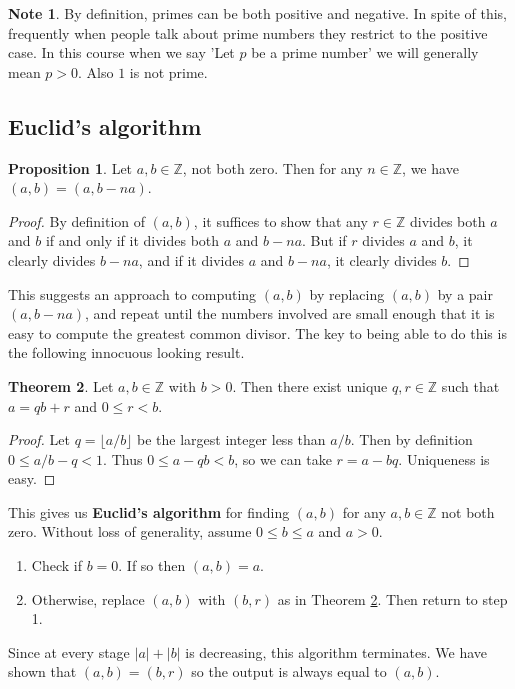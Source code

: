 \documentclass{article}
\newcommand{\Z}{\mathbb{Z}}
\newcommand{\rb}[1]{\left( #1 \right)}
\newcommand{\abs}[1]{\left\lvert #1 \right\rvert}
\theoremstyle{definition}\newtheorem{definition}{Definition}
\theoremstyle{definition}\newtheorem*{remark}{Remark}
\theoremstyle{definition}\newtheorem*{example}{Example}
\theoremstyle{definition}\newtheorem*{note}{Note}
\newtheorem{proposition}[definition]{Proposition}
\newtheorem{theorem}[definition]{Theorem}
\begin{document}
\begin{note}
By definition, primes can be both positive and negative. In spite of this, frequently when people talk about prime numbers they restrict to the positive case. In this course when we say 'Let $ p $ be a prime number' we will generally mean $ p > 0 $. Also $ 1 $ is not prime.
\end{note}

\subsection{Euclid's algorithm}

\begin{proposition}
Let $ a, b \in \Z $, not both zero. Then for any $ n \in \Z $, we have $ \rb{a, b} = \rb{a, b - na} $.
\end{proposition}

\begin{proof}
By definition of $ \rb{a, b} $, it suffices to show that any $ r \in \Z $ divides both $ a $ and $ b $ if and only if it divides both $ a $ and $ b - na $. But if $ r $ divides $ a $ and $ b $, it clearly divides $ b - na $, and if it divides $ a $ and $ b - na $, it clearly divides $ b $.
\end{proof}

This suggests an approach to computing $ \rb{a, b} $ by replacing $ \rb{a, b} $ by a pair $ \rb{a, b - na} $, and repeat until the numbers involved are small enough that it is easy to compute the greatest common divisor. The key to being able to do this is the following innocuous looking result.

\begin{theorem}
\label{thm:5}
Let $ a, b \in \Z $ with $ b > 0 $. Then there exist unique $ q, r \in \Z $ such that $ a = qb + r $ and $ 0 \le r < b $.
\end{theorem}

\begin{proof}
Let $ q = \lfloor a / b \rfloor $ be the largest integer less than $ a / b $. Then by definition $ 0 \le a / b - q < 1 $. Thus $ 0 \le a - qb < b $, so we can take $ r = a - bq $. Uniqueness is easy.
\end{proof}

This gives us \textbf{Euclid's algorithm} for finding $ \rb{a, b} $ for any $ a, b \in \Z $ not both zero. Without loss of generality, assume $ 0 \le b \le a $ and $ a > 0 $.
\begin{enumerate}
\item Check if $ b = 0 $. If so then $ \rb{a, b} = a $.
\item Otherwise, replace $ \rb{a, b} $ with $ \rb{b, r} $ as in Theorem \ref{thm:5}. Then return to step 1.
\end{enumerate}
Since at every stage $ \abs{a} + \abs{b} $ is decreasing, this algorithm terminates. We have shown that $ \rb{a, b} = \rb{b, r} $ so the output is always equal to $ \rb{a, b} $.
\end{document}
